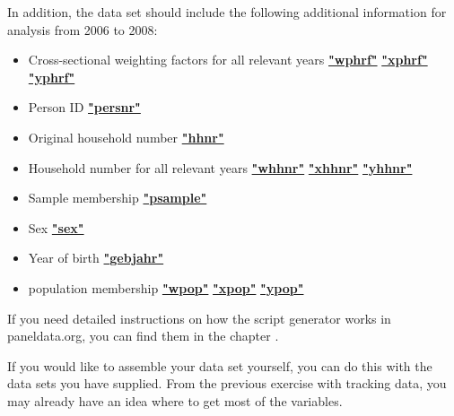 \documentclass[letterpaper,10pt,openany,onesideH,english]{sphinxmanual}
\begin{document}
In addition, the data set should include the following additional information for analysis from 2006 to 2008:
\begin{itemize}
\item {} 
Cross-sectional weighting factors for all relevant years  \href{https://paneldata.org/soep-core/data/phrf/wphrf}{\textbf{"wphrf"}}  \href{https://paneldata.org/soep-core/data/phrf/xphrf}{\textbf{"xphrf"}}  \href{https://paneldata.org/soep-core/data/phrf/yphrf}{\textbf{"yphrf"}}

\item {} 
Person ID  \href{https://paneldata.org/soep-core/data/ppfad/persnr}{\textbf{"persnr"}}

\item {} 
Original household number  \href{https://paneldata.org/soep-core/data/ppfad/hhnr}{\textbf{"hhnr"}}

\item {} 
Household number for all relevant years  \href{https://paneldata.org/soep-core/data/ppfad/whhnr}{\textbf{"whhnr"}}  \href{https://paneldata.org/soep-core/data/ppfad/xhhnr}{\textbf{"xhhnr"}}  \href{https://paneldata.org/soep-core/data/ppfad/yhhnr}{\textbf{"yhhnr"}}

\item {} 
Sample membership  \href{https://paneldata.org/soep-core/data/ppfad/psample}{\textbf{"psample"}}

\item {} 
Sex  \href{https://paneldata.org/soep-core/data/ppfad/sex}{\textbf{"sex"}}

\item {} 
Year of birth  \href{https://paneldata.org/soep-core/data/ppfad/gebjahr}{\textbf{"gebjahr"}}

\item {} 
population membership  \href{https://paneldata.org/soep-core/data/ppfad/wpop}{\textbf{"wpop"}}  \href{https://paneldata.org/soep-core/data/ppfad/xpop}{\textbf{"xpop"}}  \href{https://paneldata.org/soep-core/data/ppfad/ypop}{\textbf{"ypop"}}

\end{itemize}

If you need detailed instructions on how the script generator works in paneldata.org, you can find them in the chapter
{\hyperref[\detokenize{Working with SOEP Documentation/index:syntax}]{}}.

If you would like to assemble your data set yourself, you can do this with the data sets you have supplied. From the previous exercise with tracking data, you may already have an idea where to get most of the variables.
\end{document}
